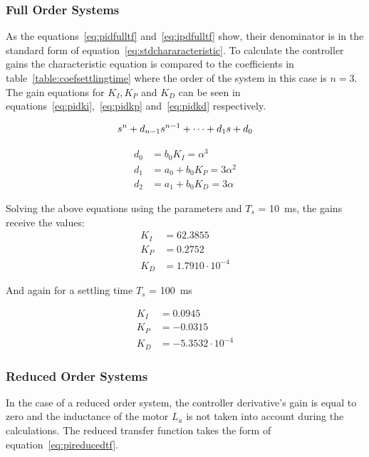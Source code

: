 \subsubsection{Full Order Systems}

As the equations~\ref{eq:pidfulltf} and~\ref{eq:ipdfulltf} show, their denominator is in the standard form of equation~\ref{eq:stdchararacteristic}. To calculate the controller gains the characteristic equation is compared to the coefficients in table~\ref{table:coefsettlingtime} where the order of the system in this case is $n=3$. The gain equations for $K_I, K_P$ and $K_D$ can be seen in equations~\ref{eq:pidki},~\ref{eq:pidkp} and~\ref{eq:pidkd} respectively. 


\begin{equation}
\centering
\label{eq:stdchararacteristic}
s^n + d_{n-1}s^{n-1} + \cdots + d_1 s + d_0 
\end{equation}

\begin{align}
\label{eq:pidki}
d_0 &= b_0 K_I = \alpha^3
\\
\label{eq:pidkp}
d_1 &= a_0 + b_0 K_P = 3\alpha^2
\\
\label{eq:pidkd}
d_2 &= a_1 + b_0 K_D = 3\alpha
\end{align}

Solving the above equations using the parameters and $T_s$ = 10~ms, the gains receive the values:
\begin{align*}
K_I &= 62.3855
\\
K_P &= 0.2752
\\
K_D &= 1.7910\cdot10^{-4}
\end{align*}

And again for a settling time $T_s$ = 100~ms

\begin{align*}
K_I &= 0.0945
\\
K_P &= -0.0315
\\
K_D &= -5.3532\cdot10^{-4}
\end{align*}


\subsubsection{Reduced Order Systems}
In the case of a reduced order system, the controller derivative's gain is equal to zero and the inductance of the motor $L_a$ is not taken into account during the calculations. The reduced transfer function takes the form of equation~\ref{eq:pireducedtf}.

